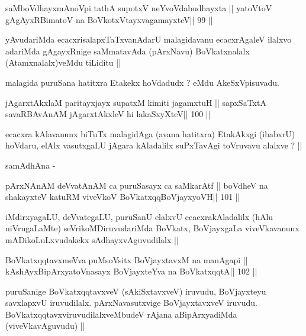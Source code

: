 \begin{shl}
saMboVdhayxmAnoV\s pi tathA supotxV neYvoVdabudhayxta ||
yatoV\s toV gAgAyxRBimatoV na BoVkotxVtayxvagamayxteV\hfill || 99 ||
\end{shl}

\begin{artha}
yAvudariMda ecacxrisalapxTaTxvanAdarU malagidavanu ecacxrAgaleV ilalxvo adariMda gAgayxRnige saMmatavAda (pArxNavu) BoVkatxnalalx (Atamxnalalx)veMdu tiLiditu ||
\end{artha} 

\begin{artha}
malagida puruSana hatitxra Etakekx hoVdadudx ? eMdu AkeSxVpisuvadu.
\end{artha}

\begin{shl}
jAgarxtAkxlaM paritayxjayx supatxM kimiti jagamxtuH ||
sapxSaTxtA savaRBAvAnAM jAgarxtAkxleV hi lakaSxyXteV\hfill || 100 ||
\end{shl}

\begin{artha}
ecacxra kAlavanunx biTuTx malagidAga (avana hatitxra) EtakAkxgi (ibabxrU) hoVdaru, elAlx vasutxgaLU jAgara kAladalilx suPxTavAgi toVruvavu  alalxve ? ||
\end{artha}

\begin{artha}
samAdhAna -
\end{artha} 

\begin{shl}
pArxNAnAM deVvatAnAM ca puruSasayx ca saMkarAtf ||
boVdheV na shakayxteV katuRM viveVkoV BoVkatxqqBoVjayxyoVH\hfill || 101 ||
\end{shl}

\begin{artha}
iMdirxyagaLU, deVvategaLU, puruSanU elalxvU ecacxrakAladalilx (hAlu niVrugaLaMte) seVrikoMDiruvudariMda BoVkatx, BoVjayxgaLa viveVkavanunx mADikoLuLxvudakekx sAdhayxvAguvudilalx ||
\end{artha} 

\begin{shl}
BoVkatxqqtavxmeVva puMsoV\s sitx BoVjayxtavxM na manAgapi ||
kAshAyxBipArxyatoV\s nasayx BoVjayxteYva na BoVkatxqqtA\hfill || 102 ||
\end{shl}

\begin{artha}
puruSanige BoVkatxqqtavxveV (sAkiSxtavxveV) iruvudu, BoVjayxteyu savxlapxvU iruvudilalx. pArxNavasutxvige BoVjayxtavxveV iruvudu. BoVkatxqqtavxviruvudilalxveMbudeV rAjana aBipArxyadiMda (viveVkavAguvudu) ||
\end{artha}

